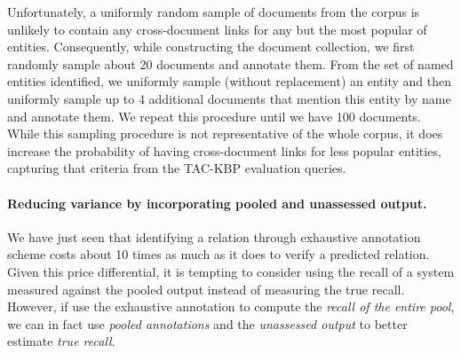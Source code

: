 Unfortunately, a uniformly random sample of documents from the corpus is unlikely to contain any cross-document links for any but the most popular of entities.
Consequently, while constructing the document collection, we first randomly sample about 20 documents and annotate them.
From the set of named entities identified, we uniformly sample (without replacement) an entity and then uniformly sample up to 4 additional documents that mention this entity by name and annotate them.
We repeat this procedure until we have 100 documents.
While this sampling procedure is not representative of the whole corpus, it does increase the probability of having cross-document links for less popular entities, capturing that criteria from the TAC-KBP evaluation queries.

\paragraph{Reducing variance by incorporating pooled and unassessed output.}
We have just seen that identifying a relation through exhaustive annotation scheme costs about 10 times as much as it does to verify a predicted relation.
Given this price differential, it is tempting to consider using the recall of a system measured against the pooled output instead of measuring the true recall.
However, if use the exhaustive annotation to compute the \textit{recall of the entire pool}, we can in fact use \textit{pooled annotations} and the \textit{unassessed output} to better estimate \textit{true recall}.

